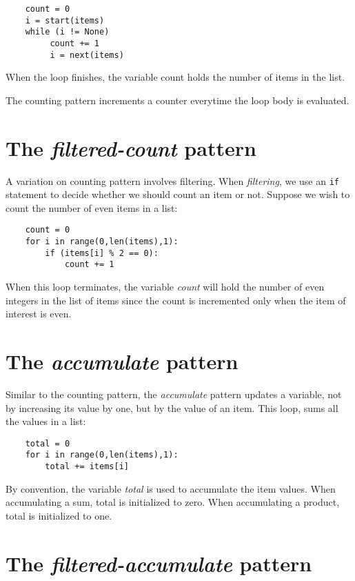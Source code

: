 \begin{verbatim}
    count = 0
    i = start(items)
    while (i != None)
         count += 1
         i = next(items)
\end{verbatim}

When the loop finishes, the variable count holds the number of
items in the list.

The counting pattern increments a counter everytime the loop
body is evaluated.

\section{The {\it filtered-count} pattern}

A variation on counting pattern involves filtering. When {\it filtering},
we use an {\tt if} statement to decide whether we should count an item
or not. Suppose we wish to count the number of even items in
a list:

\begin{verbatim}
    count = 0
    for i in range(0,len(items),1):
        if (items[i] % 2 == 0):
            count += 1
\end{verbatim}

When this loop terminates, the variable {\it count} will hold the
number of even integers in the list of items since the count
is incremented only when the item of interest is even.

\section{The {\it accumulate} pattern}

Similar to the counting pattern, the {\it accumulate} pattern
updates a variable, not by increasing its value by one, but by the value of
an item. This loop, sums all the values in a list:

\begin{verbatim}
    total = 0
    for i in range(0,len(items),1):
        total += items[i]
\end{verbatim}

By convention, the variable {\it total} is used to accumulate the item
values. When accumulating a sum, total is initialized to zero. When
accumulating a product, total is initialized to one.

\section{The {\it filtered-accumulate} pattern}


